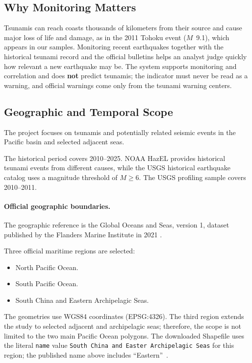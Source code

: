 \documentclass[a4paper,11pt,oneside]{book}
\begin{document}
\subsection{Why Monitoring Matters}
Tsunamis can reach coasts thousands of kilometers from their source and cause major loss of life and damage, as in the 2011 Tohoku event ($M$~9.1), which appears in our samples.
Monitoring recent earthquakes together with the historical tsunami record and the official bulletins helps an analyst judge quickly how relevant a new earthquake may be.
The system supports monitoring and correlation and does \textbf{not} predict tsunamis; the indicator must never be read as a warning, and official warnings come only from the tsunami warning centers.

\subsection{Geographic and Temporal Scope}

The project focuses on tsunamis and potentially related seismic
events in the Pacific basin and selected adjacent seas.

The historical period covers 2010--2025. NOAA HazEL provides
historical tsunami events from different causes, while the USGS
historical earthquake catalog uses a magnitude threshold of
$M \geq 6$. The USGS profiling sample covers 2010--2011.

\paragraph{Official geographic boundaries.}

The geographic reference is the Global Oceans and Seas, version 1,
dataset published by the Flanders Marine Institute in 2021
\cite{marineregions}.

Three official maritime regions are selected:

\begin{itemize}[nosep]
    \item North Pacific Ocean.
    \item South Pacific Ocean.
    \item South China and Eastern Archipelagic Seas.
\end{itemize}

The geometries use WGS84 coordinates (EPSG:4326). The third region
extends the study to selected adjacent and archipelagic seas; therefore,
the scope is not limited to the two main Pacific Ocean polygons.
The downloaded Shapefile uses the literal \texttt{name} value
\texttt{South China and Easter Archipelagic Seas} for this region;
the published name above includes ``Eastern''~\cite{marineregions}.
\end{document}
